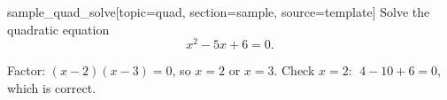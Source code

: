 %
%
%

\begin{problem}{sample_quad_solve}[topic=quad, section=sample, source=template]
	Solve the quadratic equation
	\[ x^2 - 5x + 6 = 0. \]
	\begin{solution}
	Factor: $(x - 2)(x - 3) = 0$, so $x = 2$ or $x = 3$.
	Check $x = 2$: $\;4 - 10 + 6 = 0$, which is correct.
	\end{solution}
\end{problem}

